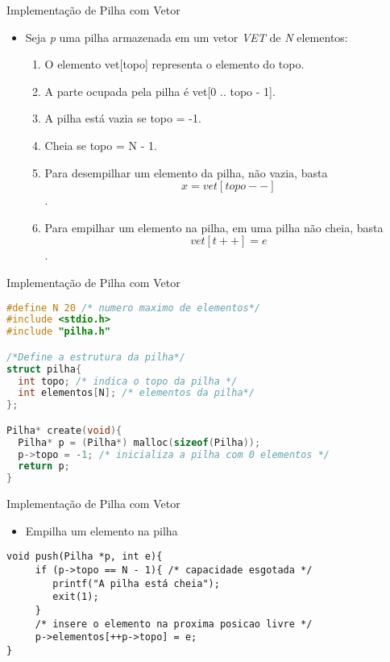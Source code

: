 \begin{frame}{Implementação de Pilha com Vetor}  
	\begin{itemize}
		\item Seja \textit{p} uma pilha armazenada em um vetor \textit{VET} de \textit{N} elementos:		
			\begin{enumerate}
				\item O elemento vet[topo] representa o elemento do topo.
				\item A parte ocupada pela pilha é vet[0 .. topo - 1].
				\item A pilha está vazia se topo = -1.
				\item Cheia se topo = N - 1.
				\item Para desempilhar um elemento da pilha, não vazia, basta $$x = vet[topo--]$$.
				\item Para empilhar um elemento na pilha, em uma pilha não cheia, basta $$vet[t++] = e$$.  
			\end{enumerate}
	\end{itemize}
\end{frame}

\begin{frame}[fragile]{Implementação de Pilha com Vetor}
\begin{lstlisting}[language=C]
#define N 20 /* numero maximo de elementos*/
#include <stdio.h>
#include "pilha.h"

/*Define a estrutura da pilha*/
struct pilha{
  int topo; /* indica o topo da pilha */
  int elementos[N]; /* elementos da pilha*/
};

Pilha* create(void){
  Pilha* p = (Pilha*) malloc(sizeof(Pilha));
  p->topo = -1; /* inicializa a pilha com 0 elementos */
  return p;
}	
	\end{lstlisting}  
\end{frame}

\begin{frame}[fragile]{Implementação de Pilha com Vetor}
\begin{itemize}
	\item Empilha um elemento na pilha
\end{itemize}
\begin{verbatim}
void push(Pilha *p, int e){
     if (p->topo == N - 1){ /* capacidade esgotada */
        printf("A pilha está cheia");
        exit(1);
     }
     /* insere o elemento na proxima posicao livre */
     p->elementos[++p->topo] = e;
}	
\end{verbatim}  
\end{frame}

